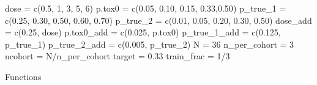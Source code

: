 \documentclass[
]{article}
\newenvironment{Shaded}{\begin{snugshade}}{\end{snugshade}}
\newcommand{\DecValTok}[1]{\textcolor[rgb]{0.00,0.00,0.81}{#1}}
\newcommand{\FloatTok}[1]{\textcolor[rgb]{0.00,0.00,0.81}{#1}}
\newcommand{\FunctionTok}[1]{\textcolor[rgb]{0.00,0.00,0.00}{#1}}
\newcommand{\NormalTok}[1]{#1}
\newcommand{\OtherTok}[1]{\textcolor[rgb]{0.56,0.35,0.01}{#1}}
\newcommand{\SpecialCharTok}[1]{\textcolor[rgb]{0.00,0.00,0.00}{#1}}
\begin{document}
\begin{Shaded}
\begin{Highlighting}[]
\NormalTok{dose }\OtherTok{=} \FunctionTok{c}\NormalTok{(}\FloatTok{0.5}\NormalTok{, }\DecValTok{1}\NormalTok{, }\DecValTok{3}\NormalTok{, }\DecValTok{5}\NormalTok{, }\DecValTok{6}\NormalTok{)}
\NormalTok{p.tox0 }\OtherTok{=} \FunctionTok{c}\NormalTok{(}\FloatTok{0.05}\NormalTok{, }\FloatTok{0.10}\NormalTok{, }\FloatTok{0.15}\NormalTok{, }\FloatTok{0.33}\NormalTok{,}\FloatTok{0.50}\NormalTok{) }
\NormalTok{p\_true\_1 }\OtherTok{=} \FunctionTok{c}\NormalTok{(}\FloatTok{0.25}\NormalTok{, }\FloatTok{0.30}\NormalTok{, }\FloatTok{0.50}\NormalTok{, }\FloatTok{0.60}\NormalTok{, }\FloatTok{0.70}\NormalTok{)}
\NormalTok{p\_true\_2 }\OtherTok{=} \FunctionTok{c}\NormalTok{(}\FloatTok{0.01}\NormalTok{, }\FloatTok{0.05}\NormalTok{, }\FloatTok{0.20}\NormalTok{, }\FloatTok{0.30}\NormalTok{, }\FloatTok{0.50}\NormalTok{)}
\NormalTok{dose\_add }\OtherTok{=} \FunctionTok{c}\NormalTok{(}\FloatTok{0.25}\NormalTok{, dose)}
\NormalTok{p.tox0\_add }\OtherTok{=} \FunctionTok{c}\NormalTok{(}\FloatTok{0.025}\NormalTok{, p.tox0)}
\NormalTok{p\_true\_1\_add }\OtherTok{=} \FunctionTok{c}\NormalTok{(}\FloatTok{0.125}\NormalTok{, p\_true\_1)}
\NormalTok{p\_true\_2\_add }\OtherTok{=} \FunctionTok{c}\NormalTok{(}\FloatTok{0.005}\NormalTok{, p\_true\_2)}
\NormalTok{N }\OtherTok{=} \DecValTok{36}
\NormalTok{n\_per\_cohort }\OtherTok{=} \DecValTok{3}
\NormalTok{ncohort }\OtherTok{=}\NormalTok{ N}\SpecialCharTok{/}\NormalTok{n\_per\_cohort}
\NormalTok{target }\OtherTok{=} \FloatTok{0.33}
\NormalTok{train\_frac }\OtherTok{=} \DecValTok{1}\SpecialCharTok{/}\DecValTok{3}
\end{Highlighting}
\end{Shaded}

Functions
\end{document}
